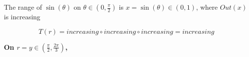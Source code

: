 \documentclass{ximera}
\begin{document}
The range of $\sin(\theta)$ on $\theta \in \left(0, \frac{\pi}{2} \right)$ is $x = \sin(\theta) \in (0, 1)$, where $Out(x)$ is increasing


\[
T(r) = increasing \circ increasing \circ increasing = increasing
\]








\textbf{\textcolor{purple!80!black}{On $r = y \in \left( \frac{\pi}{2}, \frac{2\pi}{3} \right)$, }}
\end{document}
